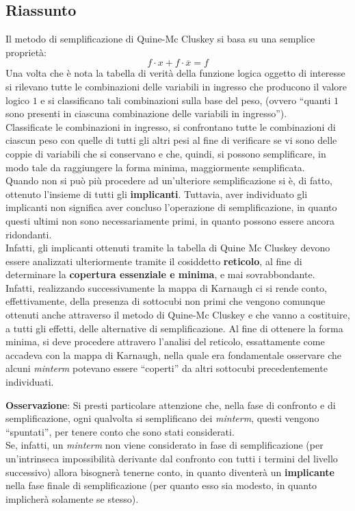 \documentclass[a4paper]{extarticle}
\newcommand{\quotes}[1]{``#1''}
\begin{document}
\subsection{Riassunto}
Il metodo di semplificazione di Quine-Mc Cluskey si basa su una semplice proprietà:
\[f \cdot x + f \cdot \overline{x} = f\]
Una volta che è nota la tabella di verità della funzione logica oggetto di interesse si rilevano tutte le combinazioni delle variabili in ingresso che producono il valore logico \(1\) e si classificano tali combinazioni sulla base del peso, (ovvero \quotes{quanti \(1\) sono presenti in ciascuna combinazione delle variabili in ingresso}).\\
Classificate le combinazioni in ingresso, si confrontano tutte le combinazioni di ciascun peso con quelle di tutti gli altri pesi al fine di verificare se vi sono delle coppie di variabili che si conservano e che, quindi, si possono semplificare, in modo tale da raggiungere la forma minima, maggiormente semplificata.\\
Quando non si può più procedere ad un'ulteriore semplificazione si è, di fatto, ottenuto l'insieme di tutti gli \textbf{implicanti}. Tuttavia, aver individuato gli implicanti non significa aver concluso l'operazione di semplificazione, in quanto questi ultimi non sono necessariamente primi, in quanto possono essere ancora ridondanti.\\
Infatti, gli implicanti ottenuti tramite la tabella di Quine Mc Cluskey devono essere analizzati ulteriormente tramite il cosiddetto \textbf{reticolo}, al fine di determinare la \textbf{copertura essenziale e minima}, e mai sovrabbondante.\\
Infatti, realizzando successivamente la mappa di Karnaugh ci si rende conto, effettivamente, della presenza di sottocubi non primi che vengono comunque ottenuti anche attraverso il metodo di Quine-Mc Cluskey e che vanno a costituire, a tutti gli effetti, delle alternative di semplificazione. Al fine di ottenere la forma minima, si deve procedere attravero l'analisi del reticolo, essattamente come accadeva con la mappa di Karnaugh, nella quale era fondamentale osservare che alcuni \textit{minterm} potevano essere \quotes{coperti} da altri sottocubi precedentemente individuati.

\vspace{1em}
\noindent
\textbf{Osservazione}: Si presti particolare attenzione che, nella fase di confronto e di semplificazione, ogni qualvolta si semplificano dei \textit{minterm}, questi vengono \quotes{spuntati}, per tenere conto che sono stati considerati.\\
Se, infatti, un \textit{minterm} non viene considerato in fase di semplificazione (per un'intrinseca impossibilità derivante dal confronto con tutti i termini del livello successivo) allora bisognerà tenerne conto, in quanto diventerà un \textbf{implicante} nella fase finale di semplificazione (per quanto esso sia modesto, in quanto implicherà solamente se stesso).
\end{document}
